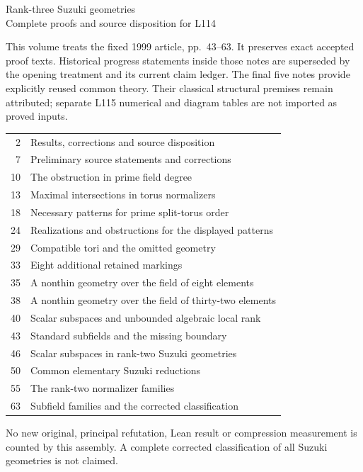 \documentclass[11pt,a4paper]{article}
\begin{document}
\begin{center}{\Large Rank-three Suzuki geometries}\\[5mm]
{\large Complete proofs and source disposition for L114}\end{center}
This volume treats the fixed 1999 article, pp.~43--63. It preserves exact
accepted proof texts. Historical progress statements inside those notes
are superseded by the opening treatment and its current claim ledger.
The final five notes provide explicitly reused common theory. Their
classical structural premises remain attributed; separate L115 numerical
and diagram tables are not imported as proved inputs.\par\medskip
\begin{tabular}{rl}
2 & Results, corrections and source disposition\\
7 & Preliminary source statements and corrections\\
10 & The obstruction in prime field degree\\
13 & Maximal intersections in torus normalizers\\
18 & Necessary patterns for prime split-torus order\\
24 & Realizations and obstructions for the displayed patterns\\
29 & Compatible tori and the omitted geometry\\
33 & Eight additional retained markings\\
35 & A nonthin geometry over the field of eight elements\\
38 & A nonthin geometry over the field of thirty-two elements\\
40 & Scalar subspaces and unbounded algebraic local rank\\
43 & Standard subfields and the missing boundary\\
46 & Scalar subspaces in rank-two Suzuki geometries\\
50 & Common elementary Suzuki reductions\\
55 & The rank-two normalizer families\\
63 & Subfield families and the corrected classification\\
\end{tabular}
\par\medskip No new original, principal refutation, Lean result or compression
measurement is counted by this assembly. A complete corrected classification
of all Suzuki geometries is not claimed.
\newpage
















\end{document}
